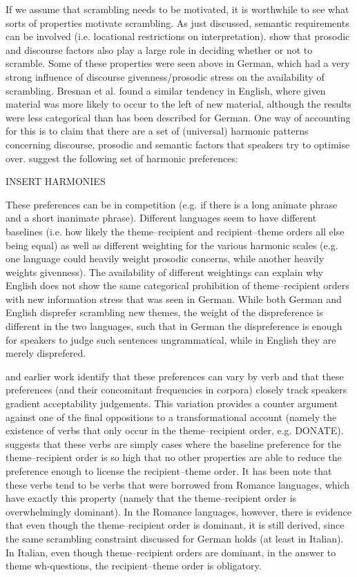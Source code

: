 \documentclass[11pt]{upenndiss}
\begin{document}
If we assume that scrambling needs to be motivated, it is worthwhile to see what sorts of properties motivate scrambling. As just discussed, semantic requirements can be involved (i.e. locational restrictions on interpretation). \cite{Bresnan.2007} show that prosodic and discourse factors also play a large role in deciding whether or not to scramble. Some of these properties were seen above in German, which had a very strong influence of discourse givenness/prosodic stress on the availability of scrambling. Bresnan et al. found a similar tendency in English, where given material was more likely to occur to the left of new material, although the results were less categorical than has been described for German. One way of accounting for this is to claim that there are a set of (universal) harmonic patterns concerning discourse, prosodic and semantic factors that speakers try to optimise over. \cite{Bresnan.2010} suggest the following set of harmonic preferences:

INSERT HARMONIES

These preferences can be in competition (e.g. if there is a long animate phrase and a short inanimate phrase). Different languages seem to have different baselines (i.e. how likely the theme--recipient and recipient--theme orders all else being equal) as well as different weighting for the various harmonic scales (e.g. one language could heavily weight prosodic concerns, while another heavily weights givenness). The availability of different weightings can explain why English does not show the same categorical prohibition of theme--recipient orders with new information stress that was seen in German. While both German and English disprefer scrambling new themes, the weight of the dispreference is different in the two languages, such that in German the dispreference is enough for speakers to judge such sentences ungrammatical, while in English they are merely disprefered.

\cite{Bresnan.2010} and earlier work identify that these preferences can vary by verb and that these preferences (and their concomitant frequencies in corpora) closely track speakers gradient acceptability judgements. This variation provides a counter argument against one of the final oppositions to a transformational account (namely the existence of verbs that only occur in the theme--recipient order, e.g. DONATE). \cite{Levin.2010} suggests that these verbs are simply cases where the baseline preference for the theme--recipient order is so high that no other properties are able to reduce the preference enough to license the recipient--theme order. It has been note that these verbs tend to be verbs that were borrowed from Romance languages, which have exactly this property (namely that the theme--recipient order is overwhelmingly dominant). In the Romance languages, however, there is evidence that even though the theme--recipient order is dominant, it is still derived, since the same scrambling constraint discussed for German holds (at least in Italian). In Italian, even though theme--recipient orders are dominant, in the answer to theme wh-questions, the recipient--theme order is obligatory.
\end{document}
